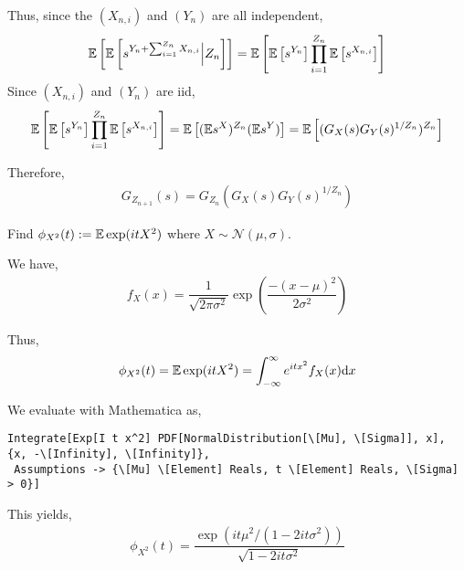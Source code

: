 \begin{solution}[Solution]
Thus, since the \( (X_{n,i}) \) and \( (Y_n) \) are all independent,
\begin{align*}
    \mathbb{E}\left[\mathbb{E} \left[s^{Y_n+\sum_{i=1}^{Z_n}X_{n,i}} \Big| Z_n \right]\right]
    = \mathbb{E}\left[\mathbb{E} \left[s^{Y_n}\right]\prod_{i=1}^{Z_n}\mathbb{E} \left[s^{X_{n,i}}\right]\right]
\end{align*}
Since \( (X_{n,i}) \) and \( (Y_n) \) are iid,
\begin{align*}
    \mathbb{E}\left[\mathbb{E} \left[s^{Y_n}\right]\prod_{i=1}^{Z_n}\mathbb{E} \left[s^{X_{n,i}}\right]\right]
    = \mathbb{E}\left[ (\mathbb{E} s^X)^{Z_n}(\mathbb{E} s^Y)\right] 
    = \mathbb{E}\left[ (G_X(s)G_Y(s)^{1/Z_n})^{Z_n}\right] 
\end{align*}

Therefore,
\begin{align*}
    G_{Z_{n+1}}(s) = G_{Z_n}\left( G_X(s) G_Y(s)^{1/Z_n} \right)
\end{align*}
\fi
\end{solution}

\begin{problem}[Exercise 3.5]
    Find \( \phi_{X^2}(t):=\mathbb{E} \exp(itX^2) \) where \( X\sim \mathcal{N}(\mu,\sigma) \).
\end{problem}

\begin{solution}[Solution]
We have,
\begin{align*}
    f_X(x) = \dfrac{1}{\sqrt{2\pi\sigma^2}}\exp\left(\dfrac{-(x-\mu)^2}{2\sigma^2}\right) 
\end{align*}

Thus,
\begin{align*}
    \phi_{X^2}(t) = \mathbb{E} \exp(itX^2) = \int_{-\infty}^{\infty} e^{itx^2}f_X(x)\mathrm{d} x 
\end{align*}

We evaluate with Mathematica as,
\begin{lstlisting}
Integrate[Exp[I t x^2] PDF[NormalDistribution[\[Mu], \[Sigma]], x], {x, -\[Infinity], \[Infinity]}, 
 Assumptions -> {\[Mu] \[Element] Reals, t \[Element] Reals, \[Sigma] > 0}]
\end{lstlisting}

This yields,
\begin{align*}
    \phi_{X^2}(t) = \dfrac{\exp(it\mu^2/(1-2it\sigma^2))}{\sqrt{1-2it\sigma^2}}
\end{align*}
\end{solution}

